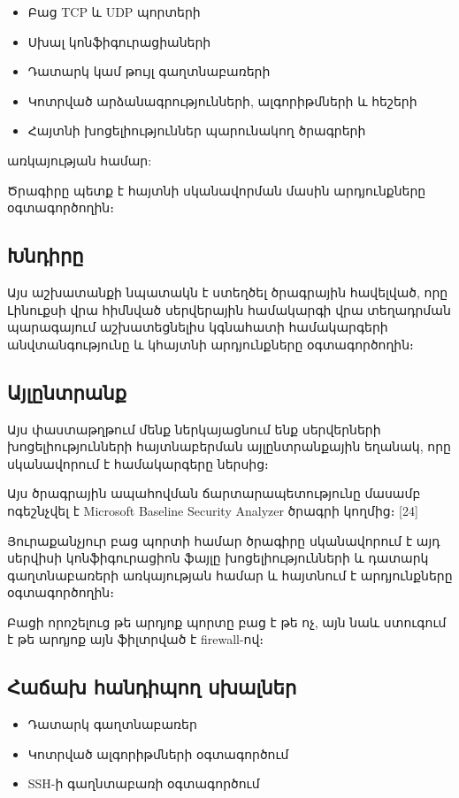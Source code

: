 \documentclass[11pt]{article}
\begin{document}
\begin{sloppypar}
\begin{itemize}
\item Բաց TCP և UDP պորտերի
\item Սխալ կոնֆիգուրացիաների
\item Դատարկ կամ թույլ գաղտնաբառերի
\item Կոտրված արձանագրությունների, ալգորիթմների և հեշերի
\item Հայտնի խոցելիություններ պարունակող ծրագրերի
\end{itemize}

առկայության համար:

Ծրագիրը պետք է հայտնի սկանավորման մասին արդյունքները օգտագործողին։


\subsection{Խնդիրը}

Այս աշխատանքի նպատակն է ստեղծել ծրագրային հավելված, որը Լինուքսի
վրա հիմնված սերվերային համակարգի վրա տեղադրման պարագայում
աշխատեցնելիս կգնահատի
համակարգերի անվտանգությունը և կհայտնի արդյունքները օգտագործողին։


\subsection{Այլընտրանք}

Այս փաստաթղթում մենք ներկայացնում ենք սերվերների խոցելիությունների
հայտնաբերման այլընտրանքային եղանակ, որը սկանավորում է համակարգերը
ներսից։

Այս ծրագրային ապահովման ճարտարապետությունը մասամբ ոգեշնչվել է
Microsoft Baseline Security Analyzer ծրագրի կողմից։ [24]

Յուրաքանչյուր բաց պորտի համար ծրագիրը սկանավորում է այդ սերվիսի
կոնֆիգուրացիոն ֆայլը խոցելիությունների և դատարկ գաղտնաբառերի
առկայության համար և հայտնում է արդյունքները օգտագործողին։

Բացի որոշելուց թե արդյոք պորտը բաց է թե ոչ, այն նաև ստուգում է
թե արդյոք այն ֆիլտրված է firewall-ով։


\subsection{Հաճախ հանդիպող սխալներ}

\begin{itemize}
\item Դատարկ գաղտնաբառեր
\item Կոտրված ալգորիթմների օգտագործում
\item SSH-ի գաղնտաբառի օգտագործում
\end{itemize}



\end{sloppypar}
\end{document}
